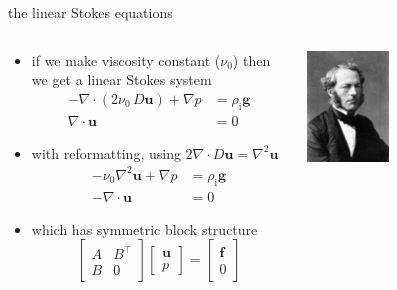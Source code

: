 \documentclass[10pt,
               hyperref={colorlinks,citecolor=DeepPink4,linkcolor=black,urlcolor=blue},
               svgnames]{beamer}
\newcommand{\bbf}{\mathbf{f}}
\newcommand{\bu}{\mathbf{u}}
\newcommand{\Div}{\nabla\cdot}
\newcommand{\rhoi}{\rho_{\text{i}}}
\begin{document}
\begin{frame}{the linear Stokes equations}

\begin{columns}

\begin{column}{0.6\textwidth}
\begin{itemize}
\item if we make viscosity constant ($\nu_0$) then we get a linear Stokes system
\begin{align*}
- \nabla \cdot \left(2 \nu_0\, D\bu\right) + \nabla p &= \rhoi \mathbf{g}  \\
\Div \bu &= 0
\end{align*}
\item with reformatting, using \quad $2 \nabla \cdot D\bu = \nabla^2 \bu$
\begin{align*}
- \nu_0 \nabla^2 \bu + \nabla p &= \rhoi \mathbf{g}  \\
-\Div \bu \qquad \,\,\,\, &= 0
\end{align*}
\item which has symmetric block structure
  $$\begin{bmatrix} A & B^\top \\ B & 0 \end{bmatrix} \begin{bmatrix} \bu \\ p  \end{bmatrix} = \begin{bmatrix} \bbf \\ 0 \end{bmatrix}$$
\end{itemize}
\end{column}

\begin{column}{0.4\textwidth}
\hfill \includegraphics[width=0.4\textwidth]{figs/people/gstokes.jpg}


\end{column}
\end{columns}
\end{frame}
\end{document}
